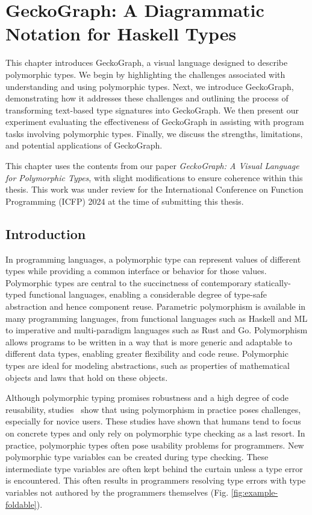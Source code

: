 


\chapter{GeckoGraph: A Diagrammatic Notation for Haskell Types}

\label{chap:gecko-graph} 
\graphicspath{{Figures/GeckoGraph}}

This chapter introduces GeckoGraph, a visual language designed to describe polymorphic types. We begin by highlighting the challenges associated with understanding and using polymorphic types. Next, we introduce GeckoGraph, demonstrating how it addresses these challenges and outlining the process of transforming text-based type signatures into GeckoGraph. We then present our experiment evaluating the effectiveness of GeckoGraph in assisting with program tasks involving polymorphic types. Finally, we discuss the strengths, limitations, and potential applications of GeckoGraph.  

 This chapter uses the contents from our paper \textit{GeckoGraph: A Visual Language for Polymorphic Types}, with slight modifications to ensure coherence within this thesis. This work was under review for the International Conference on Function Programming (ICFP) 2024 at the time of submitting this thesis.

\section{Introduction} \label{sec:intro}
In programming languages, a polymorphic type \cite{Cardelli1987-fp} can represent values of different types while providing a common interface or behavior for those values. Polymorphic types are central to the succinctness of contemporary statically-typed functional languages, enabling a considerable degree of type-safe abstraction and hence component reuse. Parametric polymorphism is available in many programming languages, from functional languages such as Haskell and ML to imperative and multi-paradigm languages such as Rust\cite{Klabnik_undated-wx} and Go\cite{Griesemer_undated-ff}. Polymorphism allows programs to be written in a way that is more generic and adaptable to different data types, enabling greater flexibility and code reuse. Polymorphic types are ideal for modeling abstractions, such as properties of mathematical objects and laws that hold on these objects. 

Although polymorphic typing promises robustness and a high degree of code reusability, studies~\cite{Jun2000-ec, Jun2000-yu} show that using polymorphism in practice poses challenges, especially for novice users. These studies have shown that humans tend to focus on concrete types and only rely on polymorphic type checking as a last resort. In practice, polymorphic types often pose usability problems for programmers. New polymorphic type variables can be created during type checking. These intermediate type variables are often kept behind the curtain unless a type error is encountered. This often results in programmers resolving type errors with type variables not authored by the programmers themselves (Fig. \ref{fig:example-foldable}).


